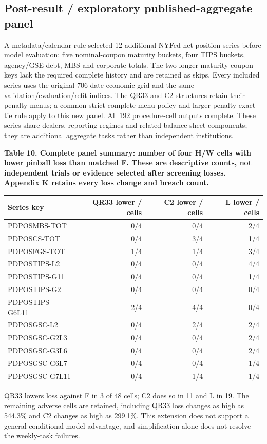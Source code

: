 \documentclass[10pt,a4paper]{article}
\begin{document}
\subsection*{Post-result / exploratory published-aggregate panel}
A metadata/calendar rule selected 12 additional NYFed net-position series before model evaluation: five nominal-coupon maturity buckets, four TIPS buckets, agency/GSE debt, MBS and corporate totals. The two longer-maturity coupon keys lack the required complete history and are retained as skips. Every included series uses the original 706-date economic grid and the same validation/evaluation/refit indices. The QR33 and C2 structures retain their penalty menus; a common strict complete-menu policy and larger-penalty exact tie rule apply to this new panel. All 192 procedure-cell outputs complete. These series share dealers, reporting regimes and related balance-sheet components; they are additional aggregate tasks rather than independent institutions.

\begin{center}
\begin{minipage}{\linewidth}
\small\textbf{Table 10. Complete panel summary: number of four H/W cells with lower pinball loss than matched F. These are descriptive counts, not independent trials or evidence selected after screening losses. Appendix K retains every loss change and breach count.}\par\medskip
\centering\fontsize{8}{10}\selectfont
\begin{tabular}{lrrr}
\toprule
Series key & QR33 lower / cells & C2 lower / cells & L lower / cells \\
\midrule
PDPOSMBS-TOT & 0/4 & 0/4 & 2/4 \\
PDPOSCS-TOT & 0/4 & 3/4 & 1/4 \\
PDPOSFGS-TOT & 1/4 & 1/4 & 3/4 \\
PDPOSTIPS-L2 & 0/4 & 0/4 & 4/4 \\
PDPOSTIPS-G11 & 0/4 & 0/4 & 1/4 \\
PDPOSTIPS-G2 & 0/4 & 0/4 & 0/4 \\
PDPOSTIPS-G6L11 & 2/4 & 4/4 & 0/4 \\
PDPOSGSC-L2 & 0/4 & 2/4 & 2/4 \\
PDPOSGSC-G2L3 & 0/4 & 0/4 & 2/4 \\
PDPOSGSC-G3L6 & 0/4 & 0/4 & 2/4 \\
PDPOSGSC-G6L7 & 0/4 & 0/4 & 1/4 \\
PDPOSGSC-G7L11 & 0/4 & 1/4 & 1/4 \\
\bottomrule
\end{tabular}
\end{minipage}
\end{center}
QR33 lowers loss against F in 3 of 48 cells; C2 does so in 11 and L in 19. The remaining adverse cells are retained, including QR33 loss changes as high as 544.3\% and C2 changes as high as 299.1\%. This extension does not support a general conditional-model advantage, and simplification alone does not resolve the weekly-task failures.
\end{document}
